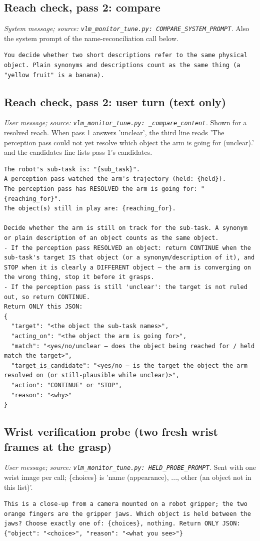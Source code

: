 \subsection*{Reach check, pass 2: compare}
\noindent\textit{System message; source: \texttt{vlm\_monitor\_tune.py: COMPARE\_SYSTEM\_PROMPT}.} Also the system prompt of the name-reconciliation call below.
\begin{lstlisting}[style=prompt]
You decide whether two short descriptions refer to the same physical object. Plain synonyms and descriptions count as the same thing (a "yellow fruit" is a banana).
\end{lstlisting}
\subsection*{Reach check, pass 2: user turn (text only)}
\noindent\textit{User message; source: \texttt{vlm\_monitor\_tune.py: \_compare\_content}.} Shown for a resolved reach. When pass 1 answers 'unclear', the third line reads 'The perception pass could not yet resolve which object the arm is going for (unclear).' and the candidates line lists pass 1's candidates.
\begin{lstlisting}[style=prompt]
The robot's sub-task is: "{sub_task}".
A perception pass watched the arm's trajectory (held: {held}).
The perception pass has RESOLVED the arm is going for: "{reaching_for}".
The object(s) still in play are: {reaching_for}.

Decide whether the arm is still on track for the sub-task. A synonym or plain description of an object counts as the same object.
- If the perception pass RESOLVED an object: return CONTINUE when the sub-task's target IS that object (or a synonym/description of it), and STOP when it is clearly a DIFFERENT object — the arm is converging on the wrong thing, stop it before it grasps.
- If the perception pass is still 'unclear': the target is not ruled out, so return CONTINUE.
Return ONLY this JSON:
{
  "target": "<the object the sub-task names>",
  "acting_on": "<the object the arm is going for>",
  "match": "<yes/no/unclear — does the object being reached for / held match the target>",
  "target_is_candidate": "<yes/no — is the target the object the arm resolved on (or still-plausible while unclear)>",
  "action": "CONTINUE" or "STOP",
  "reason": "<why>"
}
\end{lstlisting}
\subsection*{Wrist verification probe (two fresh wrist frames at the grasp)}
\noindent\textit{User message; source: \texttt{vlm\_monitor\_tune.py: HELD\_PROBE\_PROMPT}.} Sent with one wrist image per call; \{choices\} is 'name (appearance), ..., other (an object not in this list)'.
\begin{lstlisting}[style=prompt]
This is a close-up from a camera mounted on a robot gripper; the two orange fingers are the gripper jaws. Which object is held between the jaws? Choose exactly one of: {choices}, nothing. Return ONLY JSON: {"object": "<choice>", "reason": "<what you see>"}
\end{lstlisting}
